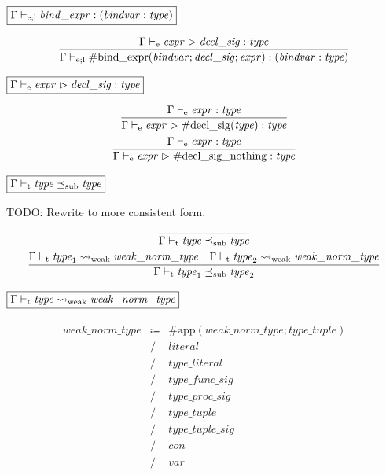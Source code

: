 $\fbox{$\Gamma \vdash_{\mathrm{e}; \mathrm{l}} \mathit{bind\_expr}: (\mathit{bindvar}: \mathit{type})$}$

\begin{gather*}
    \infer{\Gamma \vdash_{\mathrm{e}; \mathrm{l}} \mathrm{\#bind\_expr}(\mathit{bindvar}; \mathit{decl\_sig}; \mathit{expr}): (\mathit{bindvar}: \mathit{type})}{
        \Gamma \vdash_\mathrm{e} \mathit{expr} \vartriangleright \mathit{decl\_sig}: \mathit{type}
    }
\end{gather*}

$\fbox{$\Gamma \vdash_\mathrm{e} \mathit{expr} \vartriangleright \mathit{decl\_sig}: \mathit{type}$}$

\begin{gather*}
    \infer{\Gamma \vdash_\mathrm{e} \mathit{expr} \vartriangleright \mathrm{\#decl\_sig}(\mathit{type}): \mathit{type}}{
        \Gamma \vdash_\mathrm{e} \mathit{expr}: \mathit{type}
    }
    \\
    \infer{\Gamma \vdash_\mathrm{e} \mathit{expr} \vartriangleright \mathrm{\#decl\_sig\_nothing}: \mathit{type}}{
        \Gamma \vdash_\mathrm{e} \mathit{expr}: \mathit{type}
    }
\end{gather*}

$\fbox{$\Gamma \vdash_\mathrm{t} \mathit{type} \preceq_\mathrm{sub} \mathit{type}$}$

TODO: Rewrite to more consistent form.

\begin{gather*}
    \infer{\Gamma \vdash_\mathrm{t} \mathit{type} \preceq_\mathrm{sub} \mathit{type}}{}
    \\
    \infer{\Gamma \vdash_\mathrm{t} \mathit{type}_1 \preceq_\mathrm{sub} \mathit{type}_2}{
        \Gamma \vdash_\mathrm{t} \mathit{type}_1 \rightsquigarrow_\mathrm{weak} \mathit{weak\_norm\_type}
        &
        \Gamma \vdash_\mathrm{t} \mathit{type}_2 \rightsquigarrow_\mathrm{weak} \mathit{weak\_norm\_type}
    }
\end{gather*}

$\fbox{$\Gamma \vdash_\mathrm{t} \mathit{type} \rightsquigarrow_\mathrm{weak} \mathit{weak\_norm\_type}$}$

\begin{align*}
    \begin{array}{rcll}
        \mathit{weak\_norm\_type}
        &\Coloneq &\mathrm{\#app}(\mathit{weak\_norm\_type}; \mathit{type\_tuple}) \\
        &\mathrel{/} &\mathit{literal} \\
        &\mathrel{/} &\mathit{type\_literal} \\
        &\mathrel{/} &\mathit{type\_func\_sig} \\
        &\mathrel{/} &\mathit{type\_proc\_sig} \\
        &\mathrel{/} &\mathit{type\_tuple} \\
        &\mathrel{/} &\mathit{type\_tuple\_sig} \\
        &\mathrel{/} &\mathit{con} \\
        &\mathrel{/} &\mathit{var}
    \end{array}
\end{align*}

